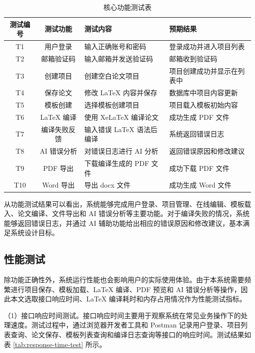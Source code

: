\documentclass{xduugthesis}
\begin{document}
\begin{table}[!ht]
    \centering
    \caption{核心功能测试表}
    \label{tab:function-test}
    \begin{tabular}{|c|c|p{6cm}|p{4cm}|}
        \hline
        测试编号 & 测试功能 & 测试内容 & 预期结果 \\
        \hline
        T1 & 用户登录 & 输入正确账号和密码 & 登录成功并进入项目列表 \\
        \hline
        T2 & 邮箱验证码 & 输入邮箱并发送验证码 & 邮箱收到验证码 \\
        \hline
        T3 & 创建项目 & 创建空白论文项目 & 项目创建成功并显示在列表中 \\
        \hline
        T4 & 保存论文 & 修改 LaTeX 内容并保存 & 数据库中项目内容更新 \\
        \hline
        T5 & 模板创建 & 选择模板创建项目 & 项目载入模板初始内容 \\
        \hline
        T6 & LaTeX 编译 & 使用 XeLaTeX 编译论文 & 成功生成 PDF 文件 \\
        \hline
        T7 & 编译失败反馈 & 输入错误 LaTeX 语法后编译 & 系统返回错误日志 \\
        \hline
        T8 & AI 错误分析 & 对错误日志进行 AI 分析 & 返回错误原因和修改建议 \\
        \hline
        T9 & PDF 导出 & 下载编译生成的 PDF 文件 & 成功下载 PDF 文件 \\
        \hline
        T10 & Word 导出 & 导出 docx 文件 & 成功生成 Word 文件 \\
        \hline
    \end{tabular}
\end{table}

从功能测试结果可以看出，系统能够完成用户登录、项目管理、在线编辑、模板载入、论文编译、文件导出和 AI 错误分析等主要功能。对于编译失败的情况，系统能够返回错误日志，并通过 AI 辅助功能给出相应的错误原因和修改建议，基本满足系统设计目标。

\subsection{性能测试}

除功能正确性外，系统运行性能也会影响用户的实际使用体验。由于本系统需要频繁进行项目保存、模板加载、LaTeX 编译、PDF 预览和 AI 错误分析等操作，因此本文选取接口响应时间、LaTeX 编译耗时和内存占用情况作为性能测试指标。

（1）接口响应时间测试。接口响应时间主要用于观察系统在常见业务操作下的处理速度。测试过程中，通过浏览器开发者工具和 Postman 记录用户登录、项目列表查询、论文保存、模板列表查询和编译日志查询等接口的响应时间。测试结果如表 \ref{tab:response-time-test} 所示。
\end{document}

